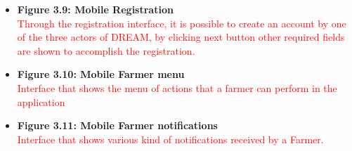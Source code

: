 \begin{itemize}
    \item \textbf{Figure 3.9: Mobile Registration}\\ 
    \textcolor{red}{Through the registration interface, it is possible to create an account by  one of the three actors of DREAM, by clicking next button other required fields are shown to accomplish the registration.}
\end{itemize}
\begin{itemize}
    \item \textbf{Figure 3.10: Mobile Farmer menu}\\ 
    \textcolor{red}{Interface that shows the menu of actions that a farmer can perform in the application}
\end{itemize}
\begin{itemize}
    \item \textbf{Figure 3.11: Mobile Farmer notifications}\\ 
    \textcolor{red}{Interface that shows various kind of notifications received by a Farmer.}
\end{itemize}
\newpage

